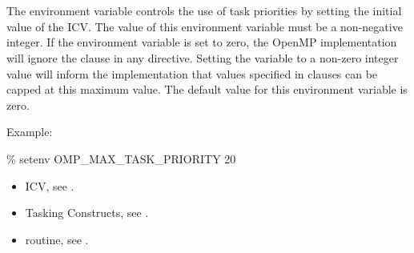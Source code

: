 \section{}
\label{sec:OMP_MAX_TASK_PRIORITY}

The  environment variable controls the use of task
priorities by setting the initial value of the  ICV. The
value of this environment variable must be a non-negative integer. If the environment
variable is set to zero, the OpenMP implementation will ignore the 
clause in any  directive. Setting the variable to a non-zero integer value
will inform the implementation that values specified in  clauses can be
capped at this maximum value. The default value for this environment variable is zero.

Example:
\begin{boxedcode}
\% setenv OMP\_MAX\_TASK\_PRIORITY 20
\end{boxedcode}

\crossreferences
\begin{itemize}
\item {} ICV, see .
\item Tasking Constructs, see .
\item {} routine, see .
\end{itemize}


